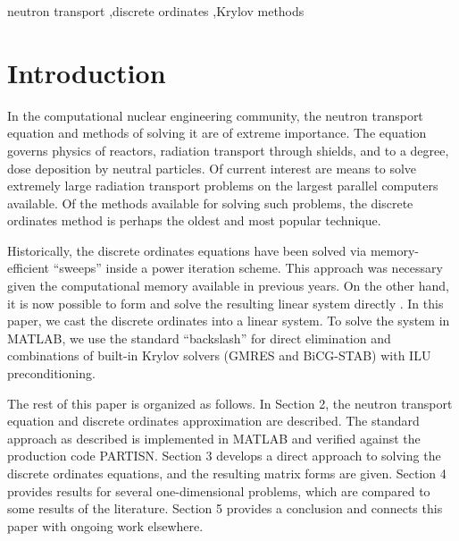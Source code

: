 \documentclass[final,3p,times,11pt]{elsarticle}
\begin{document}
\begin{frontmatter}
\begin{keyword}
neutron transport \sep discrete ordinates \sep Krylov methods
\end{keyword}

\pagebreak

\end{frontmatter}


\section{Introduction}
\label{in}

In the computational nuclear engineering community, the neutron transport equation and methods of solving it are of extreme importance.  The equation governs physics of reactors, radiation transport through shields, and to a degree, dose deposition by neutral particles.  Of current interest are means to solve extremely large radiation transport problems on the largest parallel computers available.  Of the methods available for solving such problems, the discrete ordinates method is perhaps the oldest and most popular technique.

Historically, the discrete ordinates equations have been solved via memory-efficient ``sweeps'' inside a power iteration scheme.  This approach was necessary given the computational memory available in previous years.  On the other hand, it is now possible to form and solve the resulting linear system directly \cite{patton2002apg,swesty2006std}.  In this paper, we cast the discrete ordinates into a linear system.  To solve the system in MATLAB, we use the standard ``backslash'' for direct elimination and combinations of built-in Krylov solvers (GMRES and BiCG-STAB) with ILU preconditioning.

The rest of this paper is organized as follows.  In Section 2, the neutron transport equation and discrete ordinates approximation are described.  The standard approach as described is implemented in MATLAB and verified against the production code PARTISN.  Section 3 develops a direct approach to solving the discrete ordinates equations, and the resulting matrix forms are given.  Section 4 provides results for several one-dimensional problems, which are compared to some results of the literature.  Section 5 provides a conclusion and connects this paper with ongoing work elsewhere.
\end{document}
